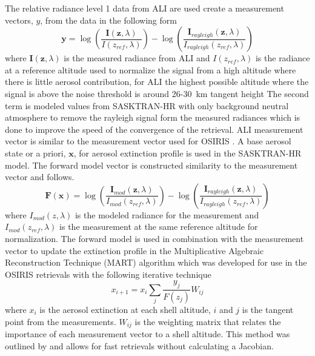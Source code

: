 \documentclass[12pt]{article}
\begin{document}
The relative radiance level 1 data from ALI are used create a measurement vectors, $y$, from the data in the following form
\begin{equation}
    \mathbf{y} = \log\left(\frac{\mathbf{I}(\mathbf{z},\lambda)}{I(z_{ref},\lambda)}\right)-\log\left(\frac{\mathbf{I}_{rayleigh}(\mathbf{z},\lambda)}{I_{rayleigh}(z_{ref},\lambda)}\right)
    \label{eqn:measurementVector}
\end{equation}
where $\mathbf{I}(\mathbf{z},\lambda)$ is the measured radiance from ALI and $I(z_{ref},\lambda)$ is the radiance at a reference altitude used to normalize the signal from a high altitude where there is little aerosol contribution, for ALI the highest possible altitude where the signal is above the noise threshold is around 26-30~km tangent height The second term is modeled values from SASKTRAN-HR with only background neutral atmosphere to remove the rayleigh signal form the measured radiances which is done to improve the speed of the convergence of the retrieval. ALI measurement vector is similar to the measurement vector used for OSIRIS \citep{Bourassa2007,Bourassa2011}. A base aerosol state or a priori, $\mathbf{x}$, for aerosol extinction profile is used in the SASKTRAN-HR model. The forward model vector is constructed similarity to the measurement vector and follows.
\begin{equation}
    \mathbf{F}(\mathbf{x}) = \log\left(\frac{\mathbf{I}_{mod}(\mathbf{z},\lambda)}{I_{mod}(z_{ref},\lambda)}\right)-\log\left(\frac{\mathbf{I}_{rayleigh}(\mathbf{z},\lambda)}{I_{rayleigh}(z_{ref},\lambda)}\right)
    \label{eqn:forwardModel}
\end{equation}
where $I_{mod}(z,\lambda)$ is the modeled radiance for the measurement and $I_{mod}(z_{ref},\lambda)$ is the measurement at the same reference altitude for normalization. The forward model is used in combination with the measurement vector to update the extinction profile in the Multiplicative Algebraic Reconstruction Technique (MART) algorithm which was developed for use in the OSIRIS retrievals \citep{Bourassa2012a} with the following iterative technique
\begin{equation}
    x_{i+1} = x_{i}\sum_{j}\frac{y_{j}}{F(z_{j})}W_{ij}
\end{equation}
where $x_{i}$ is the aerosol extinction at each shell altitude, $i$ and $j$ is the tangent point from the measurements. $W_{ij}$ is the weighting matrix that relates the importance of each measurement vector to a shell altitude. This method was outlined by \cite{Degenstein2009} and allows for fast retrievals without calculating a Jacobian.
\end{document}
